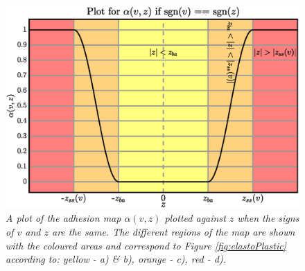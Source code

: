 \documentclass[twoside,a4paper]{article}
\begin{document}
\begin{figure}[ht]
\centerline{\includegraphics[width=1.0\columnwidth]{untitled.eps}}
\caption{\label{fig:alphaPlot}{\it A plot of the adhesion map $\alpha(v,z)$ plotted against $z$ when the signs of $v$ and $z$ are the same. The different regions of the map are shown with the coloured areas and correspond to Figure \ref{fig:elastoPlastic} according to: yellow - a) \& b), orange - c), red - d).}}
\end{figure}
\end{document}
